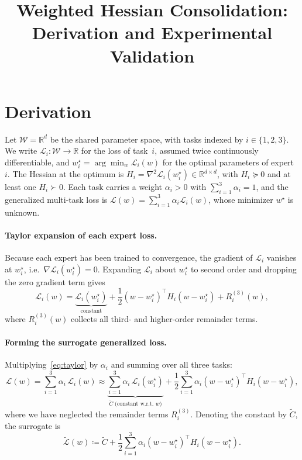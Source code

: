 \documentclass[11pt]{article}
\title{Weighted Hessian Consolidation: Derivation and Experimental Validation}
\author{}
\date{}
\begin{document}
\maketitle

\section*{Derivation}

Let $\mathcal{W} = \mathbb{R}^d$ be the shared parameter space, with tasks indexed by
$i \in \{1,2,3\}$. We write $\mathcal{L}_i : \mathcal{W} \to \mathbb{R}$ for the loss of
task~$i$, assumed twice continuously differentiable, and
$w_i^\star = \arg\min_w \mathcal{L}_i(w)$ for the optimal parameters of expert~$i$. The
Hessian at the optimum is $H_i = \nabla^2 \mathcal{L}_i(w_i^\star) \in \mathbb{R}^{d \times d}$,
with $H_i \succeq 0$ and at least one $H_i \succ 0$. Each task carries a weight
$\alpha_i > 0$ with $\sum_{i=1}^{3} \alpha_i = 1$, and the generalized multi-task loss is
$\mathcal{L}(w) = \sum_{i=1}^{3} \alpha_i \mathcal{L}_i(w)$, whose minimizer $w^\star$ is
unknown.

\paragraph{Taylor expansion of each expert loss.}
Because each expert has been trained to convergence, the gradient of $\mathcal{L}_i$
vanishes at $w_i^\star$, i.e.\ $\nabla\mathcal{L}_i(w_i^\star) = 0$. Expanding
$\mathcal{L}_i$ about $w_i^\star$ to second order and dropping the zero gradient term gives
\begin{equation}
  \mathcal{L}_i(w) = \underbrace{\mathcal{L}_i(w_i^\star)}_{\text{constant}}
    + \frac{1}{2}(w - w_i^\star)^\top H_i (w - w_i^\star) + R_i^{(3)}(w),
  \label{eq:taylor}
\end{equation}
where $R_i^{(3)}(w)$ collects all third- and higher-order remainder terms.

\paragraph{Forming the surrogate generalized loss.}
Multiplying~\eqref{eq:taylor} by $\alpha_i$ and summing over all three tasks:
\[
  \mathcal{L}(w) = \sum_{i=1}^{3} \alpha_i\,\mathcal{L}_i(w)
    \approx \underbrace{\sum_{i=1}^{3} \alpha_i\,\mathcal{L}_i(w_i^\star)}_{\widetilde C\;\text{(constant w.r.t.\ $w$)}}
    + \frac{1}{2}\sum_{i=1}^{3} \alpha_i (w - w_i^\star)^\top H_i (w - w_i^\star),
\]
where we have neglected the remainder terms $R_i^{(3)}$. Denoting the constant by
$\widetilde C$, the surrogate is
\begin{equation}
  \widetilde{\mathcal{L}}(w) \coloneqq \widetilde C
    + \frac{1}{2}\sum_{i=1}^{3} \alpha_i (w - w_i^\star)^\top H_i (w - w_i^\star).
  \label{eq:surrogate}
\end{equation}
\end{document}
